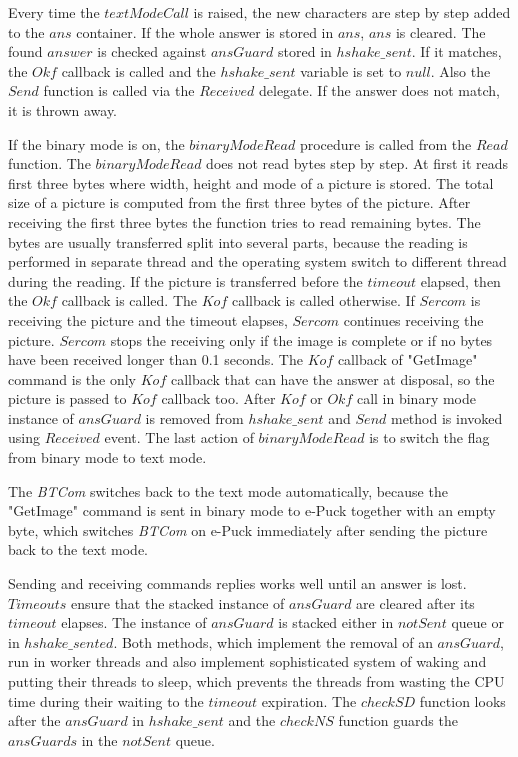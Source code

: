   Every time the $textModeCall$ is raised, the new characters are step by step
  added to the $ans$ container. If the whole answer is stored in $ans$, $ans$ is cleared.
  The found $answer$ is checked against $ansGuard$ stored in $hshake\_sent$.
  If it matches, the $Okf$ callback is called and the $hshake\_sent$ variable is set to $null$. 
  Also the $Send$ function is called via the $Received$ delegate. If the answer does not match, it is thrown away. 
  
  If the binary mode is on, the $binaryModeRead$ procedure is called from
  the $Read$ function. The $binaryModeRead$ does not read bytes step by step.
  At first it reads first three bytes where width, height and mode of a picture is stored.
  The total size of a picture is computed from the first three bytes of the picture.
  After receiving the first three bytes the function tries to read remaining bytes.
  The bytes are usually transferred split into several parts,
  because the reading is performed in separate thread and 
  the operating system switch to different thread during the reading.
  If the picture is transferred before the $timeout$ elapsed, then the $Okf$ callback is called.
  The $Kof$ callback is called otherwise. 
  If $Sercom$ is receiving the picture and the timeout elapses,
  $Sercom$ continues receiving the picture. $Sercom$ stops the receiving only if
  the image is complete or if no bytes have been received longer than 0.1 seconds.
  The $Kof$ callback of "GetImage" command is the only $Kof$ callback 
  that can have the answer at disposal, so the picture is passed to $Kof$ callback too.	
  After $Kof$ or $Okf$ call in binary mode instance of $ansGuard$ is removed from $hshake\_sent$ 
  and $Send$ method is invoked using $Received$ event.
  The last action of $binaryModeRead$ is to switch the flag from binary mode to text mode.
  
  The {\it BTCom} switches back to the text mode automatically, because
  the "GetImage" command is sent in binary mode to e-Puck together with an empty byte, which
  switches {\it BTCom} on e-Puck  immediately after sending the picture back to the text mode.

  Sending and receiving commands replies works well 
  until an answer is lost. $Timeouts$ ensure that the stacked instance of $ansGuard$ are cleared after its $timeout$  elapses.
  The instance of $ansGuard$ is stacked either in $notSent$ queue	or in $hshake\_sented$.
  Both methods, which implement the removal of an $ansGuard$, run in worker threads and also implement
  sophisticated system of waking and putting their threads to sleep, which prevents the threads from wasting
  the CPU time during their waiting to the $timeout$ expiration. 
  The $checkSD$ function looks after the $ansGuard$ in $hshake\_sent$ and the $checkNS$ function guards
  the $ansGuards$ in the $notSent$ queue.

